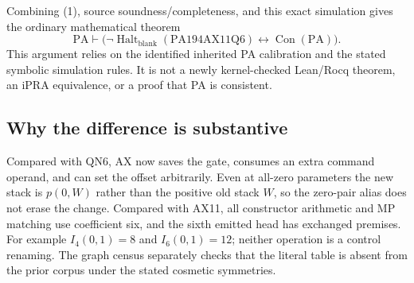 Combining (1), source soundness/completeness, and this exact simulation
gives the ordinary mathematical theorem
\[
 \boxed{\mathrm{PA}\vdash
   \bigl(\neg\operatorname{Halt}_{\mathrm{blank}}(\mathrm{PA194AX11Q6})
                    \leftrightarrow\operatorname{Con}(\mathrm{PA})\bigr).}
\]
This argument relies on the identified inherited PA calibration and
the stated symbolic simulation rules. It is not a newly kernel-checked
Lean/Rocq theorem, an iPRA equivalence, or a proof that PA is consistent.

\subsection{Why the difference is substantive}

Compared with QN6, AX now saves the gate, consumes an extra command
operand, and can set the offset arbitrarily. Even at all-zero parameters
the new stack is $p(0,W)$ rather than the positive old stack $W$, so
the zero-pair alias does not erase the change. Compared with AX11,
all constructor arithmetic and MP matching use coefficient six, and the
sixth emitted head has exchanged premises. For example
$I_4(0,1)=8$ and $I_6(0,1)=12$; neither operation is a control renaming.
The graph census separately checks that the literal table is absent
from the prior corpus under the stated cosmetic symmetries.

